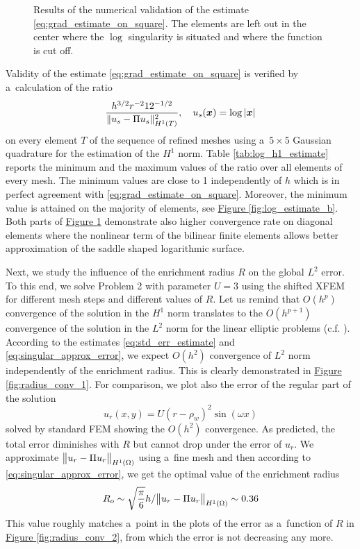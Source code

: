 \documentclass[dvipsnames,FM,Dis]{tulthesis}
\newcommand{\fig}[1]{\hyperref[#1]{Figure \ref{#1}}}
\newcommand{\results}{results/}
\begin{document}
%
\begin{figure}[!htb]
  \centering    
  \hspace{0pt}
  \caption[Log error estimate.]
  {
  Results of the numerical validation of the estimate \eqref{eq:grad_estimate_on_square}. The elements are left out 
  in the center where the $\log$ singularity is situated and where the function is cut off.
  }
  \label{fig:log_estimate}
\end{figure}
%
Validity of the estimate \eqref{eq:grad_estimate_on_square} is verified by a~calculation of the ratio
\begin{equation} \label{eqn:log_h1_estimate_ratio}
\frac{h^{3/2} r^{-2} 12^{-1/2}}{\|u_s - \Pi u_s\|^2_{H^1(T)}},\quad u_s(\mathbf{\boldsymbol{x}}) = \log \left|\mathbf{\boldsymbol{x}}\right|
\end{equation}
on every element $T$ of the sequence of refined meshes using a~$5\times5$ Gaussian quadrature for the estimation of the $H^1$ norm. Table 
\ref{tab:log_h1_estimate} reports the minimum and the maximum values of the ratio over all elements of every mesh.
The minimum values are close to 1 independently of $h$ which is in perfect agreement with \eqref{eq:grad_estimate_on_square}.
Moreover, the minimum value is attained on the majority of
elements, see \fig{fig:log_estimate_b}. Both parts of \fig{fig:log_estimate} demonstrate also higher convergence rate on diagonal elements
where the nonlinear term of the bilinear finite elements allows better approximation of the saddle shaped logarithmic surface.

Next, we study the influence of the enrichment radius $R$ on the global $L^2$ error. To this end, we solve Problem 2 with parameter $U=3$
using the shifted XFEM for different mesh steps and different values of $R$.
Let us remind that $O(h^p)$ convergence of the solution in the $H^1$ norm translates to the $O(h^{p+1})$ convergence of the solution in the $L^2$ norm 
for the linear elliptic problems (c.f. \cite[Theorem 19.2]{ciarlet_basic_1991}). According to the estimates \eqref{eq:std_err_estimate}
and \eqref{eq:singular_approx_error}, we expect $O(h^2)$ convergence of $L^2$ norm independently of the enrichment radius. This is 
clearly demonstrated in \fig{fig:radius_conv_1}. For comparison, we plot also the error of the regular part of the solution
\[
  u_r(x,y) = U(r-\rho_w)^2 \sin(\omega x)
\]
solved by standard FEM showing the $O(h^2)$ convergence.
As predicted, the total error diminishes with $R$ but cannot 
drop under the error of $u_r$. We approximate $\bigl\Vert u_r - \Pi u_r\bigr\Vert_{H^1(\Omega)}$
using a~fine mesh and then according to \eqref{eq:singular_approx_error},
we get the optimal value of the enrichment radius
\[
    R_o \sim \sqrt{\frac{\pi}{6}} h/\bigl\Vert u_r - \Pi u_r\bigr\Vert_{H^1(\Omega)} \sim 0.36
\]
This value roughly matches a~point in the plots of the error as a~function of $R$ in
\fig{fig:radius_conv_2}, from which the error is not decreasing any more.
\end{document}
